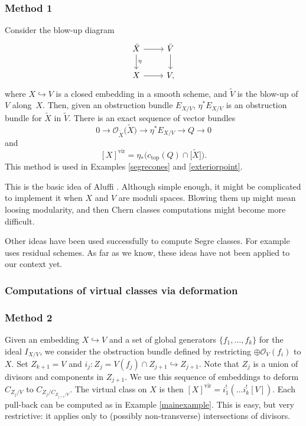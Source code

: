 \documentclass[pdftex]{sigma}
\numberwithin{equation}{section}
\newcommand{\vv}{\mathrm{vir}}
\newcommand{\OO}{\mathcal{O}}
\begin{document}
\subsubsection{Method 1} Consider the blow-up diagram
\[
\begin{tikzcd}
\tilde{X}\ar[r]\ar[d,"\eta"] & \tilde{V}\ar[d] \\
X\ar[r] & V,
\end{tikzcd}
\]
where $X\hookrightarrow V$ is a closed embedding in a smooth scheme, and $\tilde{V}$ is the blow-up of $V$ along~$X$. Then, given an obstruction bundle $E_{X/V}$, $\eta^*E_{X/V}$ is an obstruction bundle for $\tilde{X}$ in $\tilde{V}$. There is an exact sequence of vector bundles
\[ 0\to \mathcal O_{\tilde{X}}\big(\tilde{X}\big)\to \eta^*E_{X/V}\to Q\to 0
\]
and
\[
[X]^{\vv}=\eta_* \big(c_{\text{top}}(Q)\cap \big[\tilde{X}\big]\big).
\]
This method is used in Examples \ref{segrecones} and \ref{exteriorpoint}.
\begin{Remark} This is the basic idea of Aluffi \cite{A1}. Although simple enough, it might be complicated to implement it when $X$ and $V$ are moduli spaces. Blowing them up might mean loosing modularity, and then Chern classes computations might become more difficult.
\end{Remark}
\begin{Remark}Other ideas have been used successfully to compute Segre classes. For example~\cite{EJP} uses residual schemes. As far as we know, these ideas have not been applied to our context yet.
\end{Remark}

\subsubsection{Computations of virtual classes via deformation}

\subsubsection{Method 2} Given an embedding $X\hookrightarrow V$ and a set of global generators $\{f_1,\dots,f_k\}$ for the ideal $I_{X/V}$, we consider the obstruction bundle defined by restricting $\oplus \OO_V(f_i)$ to $X$. Set $Z_{k+1}=V$ and $i_j\colon Z_j=V(f_j)\cap Z_{j+1} \hookrightarrow Z_{j+1}$. Note that $Z_j$ is a union of divisors and components in $Z_{j+1}$. We use this sequence of embeddings to deform $C_{Z_j/V}$ to $C_{Z_j/C_{Z_{j+1}/V}}$. The virtual class on $X$ is then $[X]^{\vv}=i_1^!(\dots i_k^![V])$.
Each pull-back can be computed as in Example \ref{mainexample}. This is easy, but very restrictive: it applies only to (possibly non-transverse) intersections of divisors.
\end{document}
